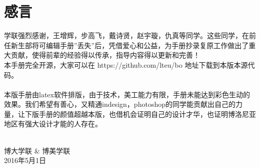 
% 
%
%
%








\clearpage{\pagestyle{empty}\cleardoublepage}
\chapter*{感言}
\thispagestyle{empty}

学联强烈感谢，王增辉，步高飞，戴诗贤，赵宇璇，仇真等同学。这些同学，在前任新生部将可编辑手册”丢失”后，凭借爱心和公益，为手册抄录复原工作做出了重大贡献，使得前辈的经验得以传承，指导内容得以更新和完善！\\
本手册完全开源，大家可以在 https://github.com/lteu/bo 地址下载到本版本源代码。\\\\
\noindent 本版手册由latex软件排版，由于技术，美工能力有限，手册未能达到彩色生动的效果。我们希望有善心，又精通indesign，photoshop的同学能贡献出自己的力量，让下版手册的颜值超越本版，也借机会证明自己的设计才华，也证明博洛尼亚地区有强大设计才能的人存在。\\\\
\begin{flushright}
博大学联 \& 博美学联 \\
2016年5月1日
\end{flushright}